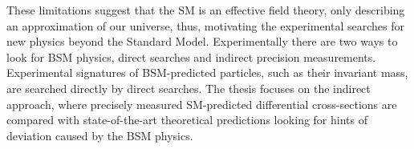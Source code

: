 These limitations suggest that the SM is an effective field theory, only describing an approximation of our universe, thus, motivating the experimental searches for new physics beyond the Standard Model. Experimentally there are two ways to look for BSM physics, direct searches and indirect precision measurements. Experimental signatures of BSM-predicted particles, such as their invariant mass, are searched directly by direct searches. The thesis focuses on the indirect approach, where precisely measured SM-predicted differential cross-sections are compared with state-of-the-art theoretical predictions looking for hints of deviation caused by the BSM physics. 
